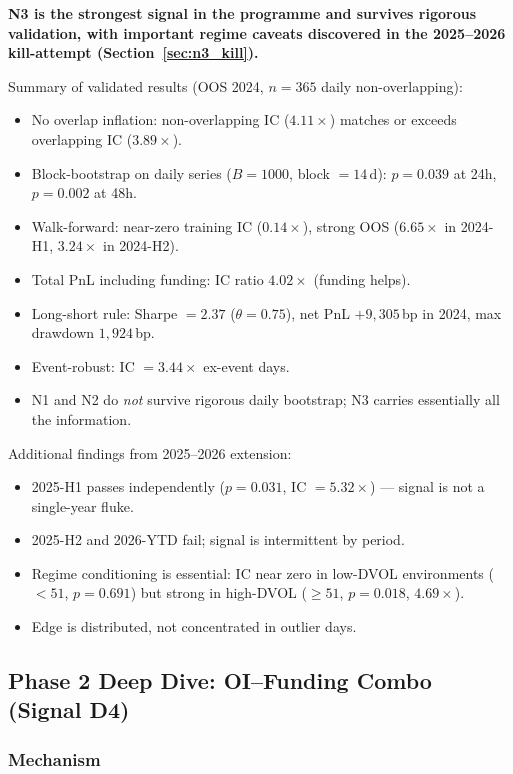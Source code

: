 \documentclass[12pt, a4paper]{article}
\theoremstyle{definition}
\begin{document}
\textbf{N3 is the strongest signal in the programme and survives rigorous
validation, with important regime caveats discovered in the 2025--2026
kill-attempt (Section~\ref{sec:n3_kill}).}

Summary of validated results (OOS 2024, $n=365$ daily non-overlapping):
\begin{itemize}[noitemsep]
  \item No overlap inflation: non-overlapping IC ($4.11\times$) matches or
        exceeds overlapping IC ($3.89\times$).
  \item Block-bootstrap on daily series ($B=1000$, block $=14$\,d):
        $p = 0.039$ at 24h, $p = 0.002$ at 48h.
  \item Walk-forward: near-zero training IC ($0.14\times$), strong OOS
        ($6.65\times$ in 2024-H1, $3.24\times$ in 2024-H2).
  \item Total PnL including funding: IC ratio $4.02\times$ (funding helps).
  \item Long-short rule: Sharpe $= 2.37$ ($\theta = 0.75$), net PnL
        $+9{,}305$\,bp in 2024, max drawdown $1{,}924$\,bp.
  \item Event-robust: IC $= 3.44\times$ ex-event days.
  \item N1 and N2 do \emph{not} survive rigorous daily bootstrap; N3 carries
        essentially all the information.
\end{itemize}

Additional findings from 2025--2026 extension:
\begin{itemize}[noitemsep]
  \item 2025-H1 passes independently ($p = 0.031$, IC $= 5.32\times$) ---
        signal is not a single-year fluke.
  \item 2025-H2 and 2026-YTD fail; signal is intermittent by period.
  \item Regime conditioning is essential: IC near zero in low-DVOL
        environments ($< 51$, $p = 0.691$) but strong in high-DVOL
        ($\geq 51$, $p = 0.018$, $4.69\times$).
  \item Edge is distributed, not concentrated in outlier days.
\end{itemize}

\subsection{Phase 2 Deep Dive: OI--Funding Combo (Signal D4)}
\label{sec:sigD4}

\subsubsection{Mechanism}
\end{document}
